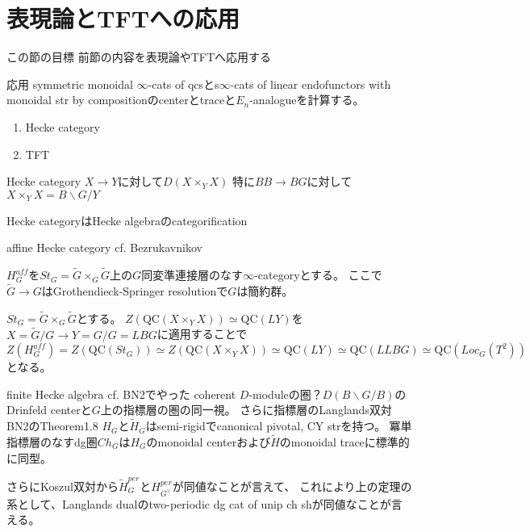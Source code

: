 \documentclass[dvipdfmx]{beamer}
\newcommand{\QC}{\mathrm{QC}}
\begin{document}
\section{表現論とTFTへの応用}

\begin{frame}{この節の目標}
前節の内容を表現論やTFTへ応用する
\end{frame}

\begin{frame}{応用}
symmetric monoidal $\infty$-cats of qcsとs$\infty$-cats of linear endofunctors with monoidal str by compositionのcenterとtraceと$E_n$-analogueを計算する。
\begin{enumerate}
\item Hecke category
\item TFT
\end{enumerate}

\end{frame}

\begin{frame}{Hecke category}
$X \to Y$に対して$D(X\times_YX)$
特に$BB \to BG$に対して$X\times_YX=B\backslash G/Y$

Hecke categoryはHecke algebraのcategorification
\end{frame}

\begin{frame}{affine Hecke category}
cf. Bezrukavnikov

$H^{aff}_G$を$St_G=\tilde{G}\times_G\tilde{G}$上の$G$同変準連接層のなす$\infty$-categoryとする。
ここで$\tilde{G} \to G$はGrothendieck-Springer resolutionで$G$は簡約群。
\end{frame}

\begin{frame}
$St_G=\tilde{G}\times_G\tilde{G}$とする。
$Z(\QC(X\times_YX)) \simeq \QC(LY)$を$X=\tilde{G}/G \to Y=G/G=LBG$に適用することで
$Z(H^{aff}_G)=Z(\QC(St_G))\simeq Z(\QC(X\times_YX))\simeq \QC(LY)\simeq \QC(LLBG)\simeq \QC(Loc_G(T^2))$となる。
\end{frame}

\begin{frame}{finite Hecke algebra}
cf. BN2でやった
coherent $D$-moduleの圏？$D(B\backslash G/B)$のDrinfeld centerと$G$上の指標層の圏の同一視。
さらに指標層のLanglands双対
BN2のTheorem1.8
$H_G$と$\tilde{H}_G$はsemi-rigidでcanonical pivotal, CY strを持つ。
冪単指標層のなすdg圏$Ch_G$は$H_G$のmonoidal centerおよび$\tilde{H}$のmonoidal traceに標準的に同型。

さらにKoszul双対から$\tilde{H}^{per}_G$と$H^{per}_{G^{\vee}}$が同値なことが言えて、
これにより上の定理の系として、Langlands dualのtwo-periodic dg cat of unip ch shが同値なことが言える。
\end{frame}
\end{document}
